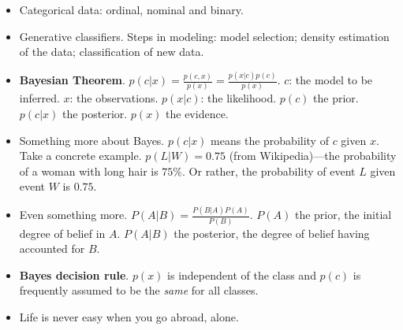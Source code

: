 \documentclass[twocolumn]{article}
\begin{document}
\begin{itemize}
\item Categorical data: ordinal, nominal and binary.
\item Generative classifiers. Steps in modeling: model selection;
  density estimation of the data; classification of new data.
\item \textbf{Bayesian
    Theorem}. $p(c|x)=\frac{p(c,x)}{p(x)}=\frac{p(x|c)p(c)}{p(x)}$. $c$:
  the model to be inferred.  $x$: the observations. $p(x|c)$: the
  likelihood. $p(c)$ the prior. $p(c|x)$ the posterior. $p(x)$ the
  evidence.
\item Something more about Bayes. $p(c|x)$ means the probability of
  $c$ given $x$. Take a concrete example. $p(L|W)=0.75$ (from
  Wikipedia)---the probability of a woman with long hair is $75\%$. Or
  rather, the probability of event $L$ given event $W$ is $0.75$.
\item Even something more. $P(A|B)=\frac{P(B|A)P(A)}{P(B)}$. $P(A)$
  the prior, the initial degree of belief in $A$. $P(A|B)$ the
  posterior, the degree of belief having accounted for $B$.
\item \textbf{Bayes decision rule}. $p(x)$ is independent of the class
  and $p(c)$ is frequently assumed to be the \emph{same} for all
  classes.
\item Life is never easy when you go abroad, alone.
\end{itemize}
\end{document}
